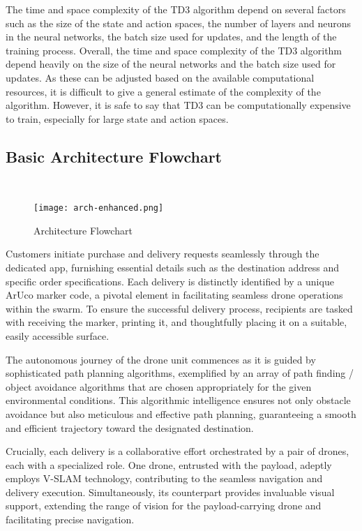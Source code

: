 \documentclass[preprint,12pt]{elsarticle}
\begin{document}
The time and space complexity of the TD3 algorithm depend on several factors such as the size of the state and action spaces, the number of layers and neurons in the neural networks, the batch size used for updates, and the length of the training process. 
Overall, the time and space complexity of the TD3 algorithm depend heavily on the size of the neural networks and the batch size used for updates. As these can be adjusted based on the available computational resources, it is difficult to give a general estimate of the complexity of the algorithm. However, it is safe to say that TD3 can be computationally expensive to train, especially for large state and action spaces. \\

\subsection{Basic Architecture Flowchart}\\

\begin{figure}[!htbp]
    \centering
    \texttt{[image: arch-enhanced.png]}
    \caption{Architecture Flowchart}
\end{figure}

Customers initiate purchase and delivery requests seamlessly through the dedicated app, furnishing essential details such as the destination address and specific order specifications. Each delivery is distinctly identified by a unique ArUco marker code, a pivotal element in facilitating seamless drone operations within the swarm. To ensure the successful delivery process, recipients are tasked with receiving the marker, printing it, and thoughtfully placing it on a suitable, easily accessible surface.

The autonomous journey of the drone unit commences as it is guided by sophisticated path planning algorithms, exemplified by an array of path finding / object avoidance algorithms that are chosen appropriately for the given environmental conditions. This algorithmic intelligence ensures not only obstacle avoidance but also meticulous and effective path planning, guaranteeing a smooth and efficient trajectory toward the designated destination.

Crucially, each delivery is a collaborative effort orchestrated by a pair of drones, each with a specialized role. One drone, entrusted with the payload, adeptly employs V-SLAM technology, contributing to the seamless navigation and delivery execution. Simultaneously, its counterpart provides invaluable visual support, extending the range of vision for the payload-carrying drone and facilitating precise navigation.
\end{document}
